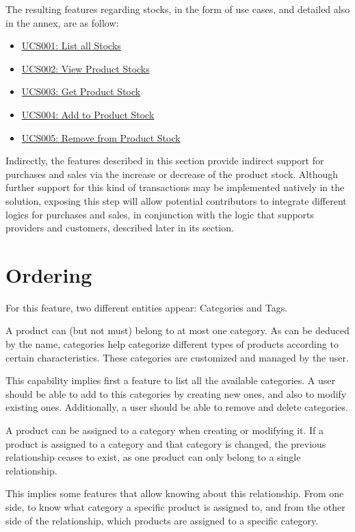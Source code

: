 The resulting features regarding stocks, in the form of use cases, and detailed also in the annex, are as follow:
\hfill\break
\begin{itemize}
\item \hyperref[UCS001]{UCS001: List all Stocks}
\item \hyperref[UCS002]{UCS002: View Product Stocks}
\item \hyperref[UCS003]{UCS003: Get Product Stock}
\item \hyperref[UCS004]{UCS004: Add to Product Stock}
\item \hyperref[UCS005]{UCS005: Remove from Product Stock}
\end{itemize}
\hfill\break
Indirectly, the features described in this section provide indirect support for purchases and sales via the increase or decrease of the product stock. Although further support for this kind of transactions may be implemented natively in the solution, exposing this step will allow potential contributors to integrate different logics for purchases and sales, in conjunction with the logic that supports providers and customers, described later in its section.

\section{Ordering}
For this feature, two different entities appear: Categories and Tags. 

A product can (but not must) belong to at most one category. As can be deduced by the name, categories help categorize different types of products according to certain characteristics. These categories are customized and managed by the user.

This capability implies first a feature to list all the available categories. A user should be able to add to this categories by creating new ones, and also to modify existing ones. Additionally, a user should be able to remove and delete categories.

A product can be assigned to a category when creating or modifying it. If a product is assigned to a category and that category is changed, the previous relationship ceases to exist, as one product can only belong to a single relationship. 

This implies some features that allow knowing about this relationship. From one side, to know what category a specific product is assigned to, and from the other side of the relationship, which products are assigned to a specific category.


